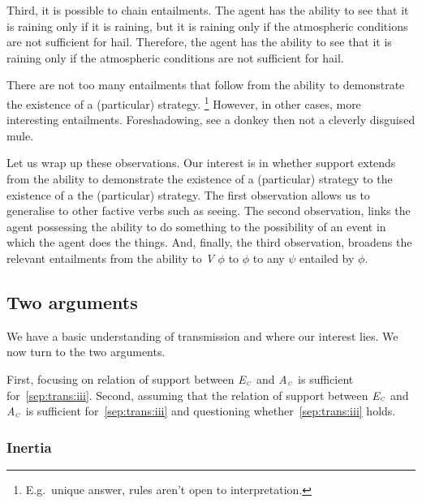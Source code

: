 \documentclass[10pt]{article}
\newcommand{\tri}[2]{\emph{#2}\(_{\text{\tiny\emph #1}}\)}
\begin{document}
\begin{note}
  Third, it is possible to chain entailments.
  The agent has the ability to see that it is raining only if it is raining, but it is raining only if the atmospheric conditions are not sufficient for hail.
  Therefore, the agent has the ability to see that it is raining only if the atmospheric conditions are not sufficient for hail.

  There are not too many entailments that follow from the ability to demonstrate the existence of a (particular) strategy.\nolinebreak
  \footnote{
    E.g.\ unique answer, rules aren't open to interpretation.
  }
  However, in other cases, more interesting entailments.
  Foreshadowing, see a donkey then not a cleverly disguised mule.
\end{note}

\begin{note}
  Let us wrap up these observations.
  Our interest is in whether support extends from the ability to demonstrate the existence of a (particular) strategy to the existence of a the (particular) strategy.
  The first observation allows us to generalise to other factive verbs such as seeing.
  The second observation, links the agent possessing the ability to do something to the possibility of an event in which the agent does the things.
  And, finally, the third observation, broadens the relevant entailments from the ability to \emph{V} \(\phi\) to \(\phi\) to any \(\psi\) entailed by \(\phi\).
\end{note}

\subsection{Two arguments}
\label{sec:two-arguments}

\begin{note}[Overview]
  We have a basic understanding of transmission and where our interest lies.
  We now turn to the two arguments.

  First, focusing on relation of support between \tri{C}{E} and \tri{C}{A} is sufficient for~\ref{sep:trans:iii}.
  Second, assuming that the relation of support between \tri{C}{E} and \tri{C}{A} is sufficient for~\ref{sep:trans:iii} and questioning whether~\ref{sep:trans:iii} holds.
\end{note}

\subsubsection{Inertia}
\label{sec:inertia}
\end{document}
